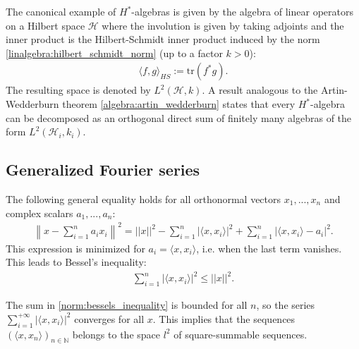     \begin{example}\label{hilbert:hilbert_schmidt_inner_product}
        The canonical example of $H^*$-algebras is given by the algebra of linear operators on a Hilbert space $\mathcal{H}$ where the involution is given by taking adjoints and the inner product is the Hilbert-Schmidt inner product induced by the norm \ref{linalgebra:hilbert_schmidt_norm} (up to a factor $k>0$):
        \begin{gather}
            \langle f,g \rangle_{HS} := \text{tr}(f^*g).
        \end{gather}
        The resulting space is denoted by $L^2(\mathcal{H}, k)$. A result analogous to the Artin-Wedderburn theorem \ref{algebra:artin_wedderburn} states that every $H^*$-algebra can be decomposed as an orthogonal direct sum of finitely many algebras of the form $L^2(\mathcal{H}_i, k_i)$.
    \end{example}

\subsection{Generalized Fourier series}

    \begin{property}
        The following general equality holds for all orthonormal vectors $x_1, ..., x_n$ and complex scalars $a_1, ..., a_n$:
        \begin{gather}
            \left\lVert x - \sum_{i=1}^n a_ix_i\right\rVert^2 = ||x||^2 - \sum_{i=1}^n|\langle x, x_i\rangle|^2 + \sum_{i=1}^n|\langle x, x_i\rangle - a_i|^2.
        \end{gather}
        This expression is minimized for $a_i = \langle x, x_i\rangle$, i.e. when the last term vanishes. This leads to Bessel's inequality:
        \begin{gather}
            \label{norm:bessels_inequality}
            \sum_{i=1}^n|\langle x, x_i\rangle|^2 \leq ||x||^2.
        \end{gather}
    \end{property}
    \begin{result}
        The sum in \ref{norm:bessels_inequality} is bounded for all $n$, so the series $\sum_{i=1}^{+\infty}|\langle x,x_i\rangle|^2$ converges for all $x$. This implies that the sequences $(\langle x, x_n\rangle)_{n\in\mathbb{N}}$ belongs to the space $l^2$ of square-summable sequences.
    \end{result}

